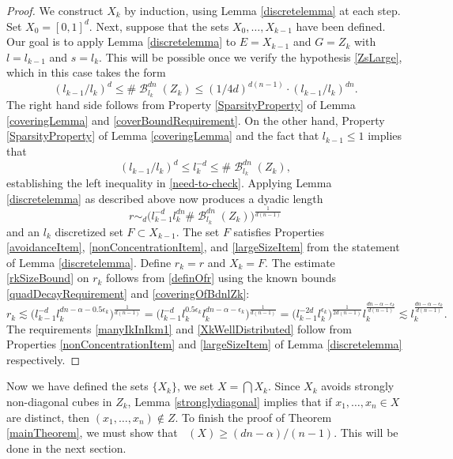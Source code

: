 \documentclass[dvipsnames,letterpaper,12pt]{article}
\numberwithin{equation}{section}
\theoremstyle{plain}
\theoremstyle{remark}
\DeclareMathOperator{\hausdim}{\dim_{\mathbf{H}}}
\DeclareMathOperator{\B}{\mathcal{B}}
\begin{document}
\begin{proof}
	We construct $X_k$ by induction, using Lemma \ref{discretelemma} at each step. Set $X_0=[0,1]^d$. Next, suppose that the sets $X_0, \ldots, X_{k-1}$ have been defined. Our goal is to apply Lemma \ref{discretelemma} to $E = X_{k-1}$ and $G = Z_k$ with $l = l_{k-1}$ and $s = l_k$. This will be possible once we verify the hypothesis \eqref{ZsLarge}, which in this case takes the form
	\begin{equation}
		(l_{k-1}/l_k)^d \leq \#\B_{l_k}^{dn}(Z_k) \leq (1/4d)^{d(n-1)} \cdot (l_{k-1}/l_k)^{dn}. \label{need-to-check}
	\end{equation}
	The right hand side follows from Property \ref{SparsityProperty} of Lemma \ref{coveringLemma} and \eqref{coverBoundRequirement}. On the other hand, Property \ref{SparsityProperty} of Lemma \ref{coveringLemma} and the fact that $l_{k-1} \leq 1$ implies that
	\[ (l_{k-1}/l_k)^d\leq l_{k}^{-d}\leq \#\B_{l_k}^{dn}(Z_k), \]
	establishing the left inequality in \eqref{need-to-check}. Applying Lemma \ref{discretelemma} as described above now produces a dyadic length
	\begin{equation}\label{definOfr}
		r \sim_d \big(l_{k-1}^{-d}l_k^{dn} \# \B^{dn}_{l_k}(Z_k)\big)^{\frac{1}{d(n-1)}} 
	\end{equation}
	and an $l_k$ discretized set $F \subset X_{k-1}$. The set $F$ satisfies Properties \ref{avoidanceItem}, \ref{nonConcentrationItem}, and \ref{largeSizeItem} from the statement of Lemma \ref{discretelemma}. Define $r_k=r$ and $X_k=F$. The estimate  \eqref{rkSizeBound} on $r_k$ follows from \eqref{definOfr} using the known bounds \eqref{quadDecayRequirement} and \eqref{coveringOfBdnlZk}:
	\[ r_k \lesssim \bigl( l_{k-1}^{-d}  l_k^{dn -\alpha - 0.5 \epsilon_k} \bigr)^{\frac{1}{d(n-1)}} = \bigl( l_{k-1}^{-d} l_k^{0.5 \epsilon_k} l_k^{dn -\alpha - \epsilon_k} \bigr)^{\frac{1}{d(n-1)}} = \bigl( l_{k-1}^{-2d} l_k^{\epsilon_k}\bigr)^{\frac{1}{2d(n-1)}} l_{k}^{\frac{dn-\alpha -\epsilon_k}{d(n-1)}} \lesssim l_{k}^{\frac{dn-\alpha -\epsilon_k}{d(n-1)}}. \]
	The requirements \eqref{manyIkInIkm1} and \eqref{XkWellDistributed} follow from Properties \ref{nonConcentrationItem} and \ref{largeSizeItem} of Lemma \ref{discretelemma} respectively.
\end{proof} 

Now we have defined the sets $\{ X_k \}$, we set $X = \bigcap X_k$. Since $X_k$ avoids strongly non-diagonal cubes in $Z_k$, Lemma \ref{stronglydiagonal} implies that if $x_1, \dots, x_n \in X$ are distinct, then $(x_1, \dots, x_n) \not \in Z$. To finish the proof of Theorem \ref{mainTheorem}, we must show that $\hausdim(X) \geq (dn - \alpha)/(n - 1)$. This will be done in the next section. 
\end{document}
